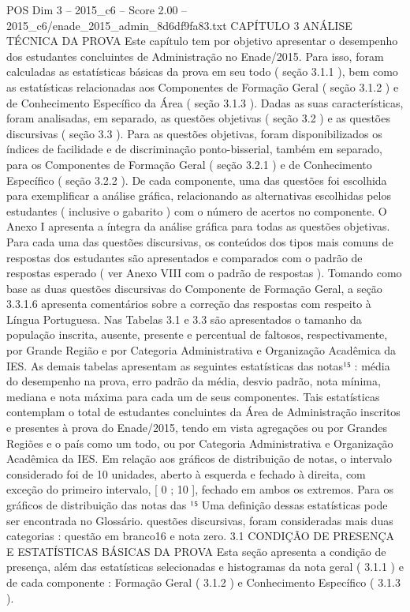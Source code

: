 \begin{textsample}{POS Dim 3 – 2015\_c6 – Score 2.00 – 2015\_c6/enade\_2015\_admin\_8d6df9fa83.txt}  \label{ex:f3_pos_212}
CAPÍTULO 3 ANÁLISE TÉCNICA DA PROVA Este capítulo tem por objetivo apresentar o desempenho dos estudantes concluintes de Administração no Enade/2015.
Para isso, foram calculadas as estatísticas básicas da prova em seu todo ( seção 3.1.1 ), bem como as estatísticas relacionadas aos Componentes de Formação Geral ( seção 3.1.2 ) e de Conhecimento Específico da Área ( seção 3.1.3 ).
Dadas as suas características, foram analisadas, em separado, as questões objetivas ( seção 3.2 ) e as questões discursivas ( seção 3.3 ).
Para as questões objetivas, foram disponibilizados os índices de facilidade e de discriminação ponto-bisserial, também em separado, para os Componentes de Formação Geral ( seção 3.2.1 ) e de Conhecimento Específico ( seção 3.2.2 ).
De cada componente, uma das questões foi escolhida para exemplificar a análise gráfica, relacionando as alternativas escolhidas pelos estudantes ( inclusive o gabarito ) com o número de acertos no componente.
O Anexo I apresenta a íntegra da análise gráfica para todas as questões objetivas.
Para cada uma das questões discursivas, os conteúdos dos tipos mais comuns de respostas dos estudantes são apresentados e comparados com o padrão de respostas esperado ( ver Anexo VIII com o padrão de respostas ).
Tomando como base as duas questões discursivas do Componente de Formação Geral, a seção 3.3.1.6 apresenta comentários sobre a correção das respostas com respeito à Língua Portuguesa.
Nas Tabelas 3.1 e 3.3 são apresentados o tamanho da população inscrita, ausente, presente e percentual de faltosos, respectivamente, por Grande Região e por Categoria Administrativa e Organização Acadêmica da IES.
As demais tabelas apresentam as seguintes estatísticas das notas¹⁵ : média do desempenho na prova, erro padrão da média, desvio padrão, nota mínima, mediana e nota máxima para cada um de seus componentes.
Tais estatísticas contemplam o total de estudantes concluintes da Área de Administração inscritos e presentes à prova do Enade/2015, tendo em vista agregações ou por Grandes Regiões e o país como um todo, ou por Categoria Administrativa e Organização Acadêmica da IES.
Em relação aos gráficos de distribuição de notas, o intervalo considerado foi de 10 unidades, aberto à esquerda e fechado à direita, com exceção do primeiro intervalo, [ 0 ; 10 ], fechado em ambos os extremos.
Para os gráficos de distribuição das notas das ¹⁵ Uma definição dessas estatísticas pode ser encontrada no Glossário. questões discursivas, foram consideradas mais duas categorias : questão em branco16 e nota zero. 3.1 CONDIÇÃO DE PRESENÇA E ESTATÍSTICAS BÁSICAS DA PROVA Esta seção apresenta a condição de presença, além das estatísticas selecionadas e histogramas da nota geral ( 3.1.1 ) e de cada componente : Formação Geral ( 3.1.2 ) e Conhecimento Específico ( 3.1.3 ).

\end{textsample}
